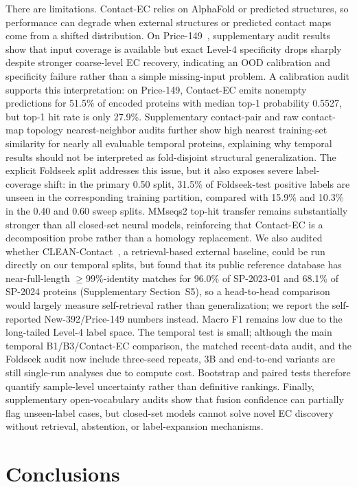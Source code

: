 \documentclass[numbered,contemporary,mediumone]{oup-authoring-template}
\begin{document}
There are limitations. Contact-EC relies on AlphaFold or predicted structures, so
performance can degrade when external structures or predicted contact maps come
from a shifted distribution. On Price-149~\citep{price2018}, supplementary audit results show that
input coverage is available but exact Level-4 specificity drops sharply despite
stronger coarse-level EC recovery, indicating an OOD calibration and specificity
failure rather than a simple missing-input problem. A calibration audit supports
this interpretation: on Price-149, Contact-EC emits nonempty predictions for
51.5\% of encoded proteins with median top-1 probability 0.5527, but top-1
hit rate is only 27.9\%. Supplementary contact-pair and raw contact-map topology
nearest-neighbor audits further show high nearest training-set similarity for
nearly all evaluable temporal proteins, explaining why temporal results should
not be interpreted as fold-disjoint structural generalization. The explicit
Foldseek split addresses this issue, but it also exposes severe label-coverage
shift: in the primary 0.50 split, 31.5\% of Foldseek-test positive labels are
unseen in the corresponding training partition, compared with 15.9\% and 10.3\%
in the 0.40 and 0.60 sweep splits. MMseqs2 top-hit transfer remains
substantially stronger than all closed-set neural models, reinforcing that
Contact-EC is a decomposition probe rather than a homology replacement. We also
audited whether CLEAN-Contact~\citep{ayres2024}, a retrieval-based external
baseline, could be run directly on our temporal splits, but found that its
public reference database has near-full-length $\geq99\%$-identity matches
for 96.0\% of SP-2023-01 and 68.1\% of SP-2024 proteins (Supplementary
Section~S5), so a head-to-head comparison would largely measure self-retrieval
rather than generalization; we report the self-reported New-392/Price-149
numbers instead. Macro F1 remains low due to the long-tailed Level-4 label
space. The temporal test is small; although the main temporal B1/B3/Contact-EC
comparison, the matched recent-data audit, and the Foldseek audit now include
three-seed repeats, 3B and end-to-end variants are still single-run analyses due
to compute cost. Bootstrap and
paired tests therefore quantify sample-level uncertainty rather than definitive
rankings. Finally, supplementary open-vocabulary audits show that fusion confidence
can partially flag unseen-label cases, but closed-set models cannot solve novel EC
discovery without retrieval, abstention, or label-expansion mechanisms.

\section{Conclusions}
\end{document}
